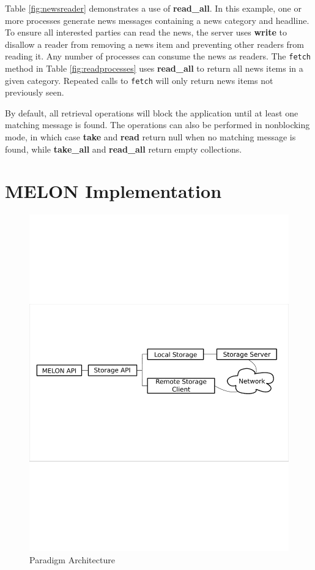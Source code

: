 \documentclass[lnicst]{svmultln}
\begin{document}
Table \ref{fig:newsreader} demonstrates a use of \textbf{read\_all}. In this example, one or more processes generate news messages containing a news category and headline. To ensure all interested parties can read the news, the server uses \textbf{write} to disallow a reader from removing a news item and preventing other readers from reading it. Any number of processes can consume the news as readers. The \texttt{fetch} method in Table \ref{fig:readprocesses} uses \textbf{read\_all} to return all news items in a given category. Repeated calls to \texttt{fetch} will only return news items not previously seen.

By default, all retrieval operations will block the application until at least one matching message is found. The operations can also be performed in nonblocking mode, in which case \textbf{take} and \textbf{read} return null when no matching message is found, while \textbf{take\_all} and \textbf{read\_all} return empty collections.
   
\section{MELON Implementation}\label{sec:implementation}

\begin{figure}
\centering
\includegraphics[scale = .50, clip, trim = 10px 350px 10px 312px]{figures/paradigm_arch.pdf}
\caption{Paradigm Architecture}
\label{fig:architecture}
\end{figure}
\end{document}
